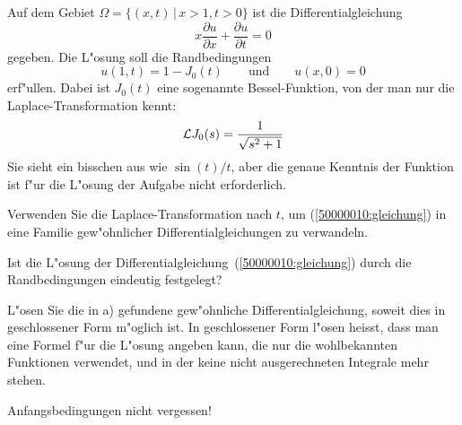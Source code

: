 Auf dem Gebiet $\Omega=\{(x,t)\,|\, x>1,t > 0\}$
ist die Differentialgleichung
\begin{equation}
x\frac{\partial u}{\partial x}+\frac{\partial u}{\partial t}=0
\label{50000010:gleichung}
\end{equation}
gegeben. Die L"osung soll die Randbedingungen
\[
u(1,t)=1-J_0(t)
\qquad
\text{und}
\qquad
u(x,0)=0
\]
erf"ullen.
Dabei ist $J_0(t)$ eine sogenannte Bessel-Funktion, von der man nur
die Laplace-Transformation kennt:
\[
{\cal L}J_0(s)=\frac1{\sqrt{s^2+1}}
\]
Sie sieht ein bisschen aus wie $\sin(t)/t$, aber die genaue Kenntnis der
Funktion ist f"ur die L"osung der Aufgabe nicht erforderlich.
\begin{teilaufgaben}
\item Verwenden Sie die Laplace-Transformation nach $t$,
um (\ref{50000010:gleichung}) in eine Familie gew"ohnlicher
Differentialgleichungen zu verwandeln.
\item 
Ist die L"osung der Differentialgleichung~(\ref{50000010:gleichung}) durch
die Randbedingungen eindeutig festgelegt?
\item
L"osen Sie die in a) gefundene gew"ohnliche Differentialgleichung,
soweit dies in geschlossener Form m"oglich ist.
In geschlossener Form
l"osen heisst, dass man eine Formel f"ur die L"osung angeben kann, die 
nur die wohlbekannten Funktionen verwendet, und in der keine nicht
ausgerechneten Integrale mehr stehen.
\end{teilaufgaben}

\begin{hinweis}
Anfangsbedingungen nicht vergessen!
\end{hinweis}

